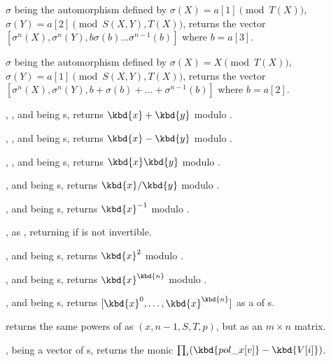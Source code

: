$\sigma$ being the automorphism defined by $\sigma(X)=a[1]\pmod{T(X)}$,
$\sigma(Y)=a[2]\pmod{S(X,Y),T(X)}$, returns the vector
$[\sigma^n(X),\sigma^n(Y),b\sigma(b)\ldots\sigma^{n-1}(b)]$
where $b=a[3]$.

$\sigma$ being the automorphism defined by $\sigma(X)=X\pmod{T(X)}$,
$\sigma(Y)=a[1]\pmod{S(X,Y),T(X)}$, returns the vector
$[\sigma^n(X),\sigma^n(Y),b+\sigma(b)+\ldots+\sigma^{n-1}(b)]$
where $b=a[2]$.


, ,  and
 being s, returns $\kbd{x} + \kbd{y}$ modulo .

, ,  and
 being s, returns $\kbd{x} - \kbd{y}$ modulo .

, ,  and
 being s, returns $\kbd{x}\*\kbd{y}$ modulo .

,  and
 being s, returns $\kbd{x}/\kbd{y}$ modulo .

,  and
 being s, returns $\kbd{x}^{-1}$ modulo .

 , as ,
returning  if  is not invertible.

,  and
 being s, returns $\kbd{x}^2$ modulo .

,  and
 being s, returns $\kbd{x}^\kbd{n}$ modulo .

,  and
 being s, returns $[\kbd{x}^0, \dots, \kbd{x}^\kbd{n}]$ as a
 of s.

returns the same powers of  as $(x, n-1,S, T, p)$,
but as an $m\times n$ matrix.

,
 being a vector of s, returns the monic 
$\prod_i (\kbd{pol\_x[v]} - \kbd{V[i]})$.

